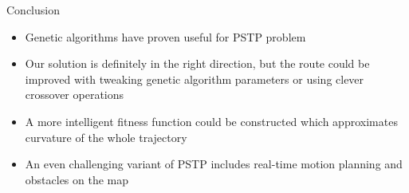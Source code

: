 \documentclass[final,t]{beamer}
\begin{document}
\begin{frame}{}
\begin{columns}[t]
\begin{column}{.305\linewidth}
\begin{block}{Conclusion}
        \begin{itemize}
        \item \alert{Genetic algorithms} have proven useful for PSTP problem
        \item Our solution is definitely in the right direction, but the route could be improved with \alert{tweaking genetic algorithm parameters} or using clever crossover operations
        \item A more intelligent fitness function could be constructed which approximates curvature of the whole trajectory
        \item An even challenging variant of PSTP includes real-time motion planning and obstacles on the map
        \end{itemize}

      \end{block}

    \end{column}
  \end{columns}
\end{frame}
\end{document}
